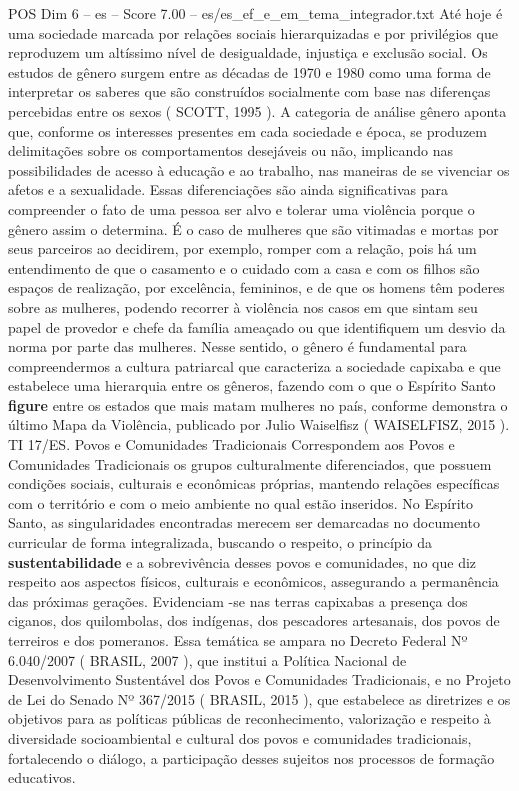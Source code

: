 \begin{textsample}{POS Dim 6 – es – Score 7.00 – es/es\_ef\_e\_em\_tema\_integrador.txt}
Até hoje é uma sociedade marcada por relações sociais hierarquizadas e por privilégios que reproduzem um altíssimo nível de desigualdade, injustiça e exclusão social.
Os estudos de gênero surgem entre as décadas de 1970 e 1980 como uma forma de interpretar os saberes que são construídos socialmente com base nas diferenças percebidas entre os sexos ( SCOTT, 1995 ).
A categoria de análise gênero aponta que, conforme os interesses presentes em cada sociedade e época, se produzem delimitações sobre os comportamentos desejáveis ou não, implicando nas possibilidades de acesso à educação e ao trabalho, nas maneiras de se vivenciar os afetos e a sexualidade.
Essas diferenciações são ainda significativas para compreender o fato de uma pessoa ser alvo e tolerar uma violência porque o gênero assim o determina.
É o caso de mulheres que são vitimadas e mortas por seus parceiros ao decidirem, por exemplo, romper com a relação, pois há um entendimento de que o casamento e o cuidado com a casa e com os filhos são espaços de realização, por excelência, femininos, e de que os homens têm poderes sobre as mulheres, podendo recorrer à violência nos casos em que sintam seu papel de provedor e chefe da família ameaçado ou que identifiquem um desvio da norma por parte das mulheres.
Nesse sentido, o gênero é fundamental para compreendermos a cultura patriarcal que caracteriza a sociedade capixaba e que estabelece uma hierarquia entre os gêneros, fazendo com o que o Espírito Santo \textbf{figure} entre os estados que mais matam mulheres no país, conforme demonstra o último Mapa da Violência, publicado por Julio Waiselfisz ( WAISELFISZ, 2015 ).
TI 17/ES.
Povos e Comunidades Tradicionais Correspondem aos Povos e Comunidades Tradicionais os grupos culturalmente diferenciados, que possuem condições sociais, culturais e econômicas próprias, mantendo relações específicas com o território e com o meio ambiente no qual estão inseridos.
No Espírito Santo, as singularidades encontradas merecem ser demarcadas no documento curricular de forma integralizada, buscando o respeito, o princípio da \textbf{sustentabilidade} e a sobrevivência desses povos e comunidades, no que diz respeito aos aspectos físicos, culturais e econômicos, assegurando a permanência das próximas gerações.
Evidenciam -se nas terras capixabas a presença dos ciganos, dos quilombolas, dos indígenas, dos pescadores artesanais, dos povos de terreiros e dos pomeranos.
Essa temática se ampara no Decreto Federal Nº 6.040/2007 ( BRASIL, 2007 ), que institui a Política Nacional de Desenvolvimento Sustentável dos Povos e Comunidades Tradicionais, e no Projeto de Lei do Senado Nº 367/2015 ( BRASIL, 2015 ), que estabelece as diretrizes e os objetivos para as políticas públicas de reconhecimento, valorização e respeito à diversidade socioambiental e cultural dos povos e comunidades tradicionais, fortalecendo o diálogo, a participação desses sujeitos nos processos de formação educativos.

\end{textsample}
